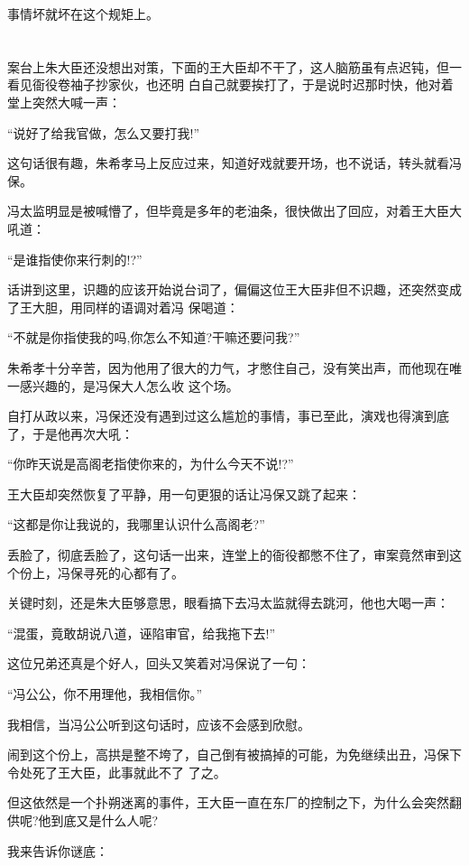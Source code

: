 \documentclass[11pt,a4paper,onecolumn]{article}
\begin{document}
事情坏就坏在这个规矩上。

\section[\thesection]{}

案台上朱大臣还没想出对策，下面的王大臣却不干了，这人脑筋虽有点迟钝，但一看见衙役卷袖子抄家伙，也还明
白自己就要挨打了，于是说时迟那时快，他对着堂上突然大喊一声：

``说好了给我官做，怎么又要打我!''

这句话很有趣，朱希孝马上反应过来，知道好戏就要开场，也不说话，转头就看冯保。

冯太监明显是被喊懵了，但毕竟是多年的老油条，很快做出了回应，对着王大臣大吼道：

``是谁指使你来行刺的!?''

话讲到这里，识趣的应该开始说台词了，偏偏这位王大臣非但不识趣，还突然变成了王大胆，用同样的语调对着冯
保喝道：

``不就是你指使我的吗,你怎么不知道?干嘛还要问我?''

朱希孝十分辛苦，因为他用了很大的力气，才憋住自己，没有笑出声，而他现在唯一感兴趣的，是冯保大人怎么收
这个场。

自打从政以来，冯保还没有遇到过这么尴尬的事情，事已至此，演戏也得演到底了，于是他再次大吼：

``你昨天说是高阁老指使你来的，为什么今天不说!?''

王大臣却突然恢复了平静，用一句更狠的话让冯保又跳了起来：

``这都是你让我说的，我哪里认识什么高阁老?''

丢脸了，彻底丢脸了，这句话一出来，连堂上的衙役都憋不住了，审案竟然审到这个份上，冯保寻死的心都有了。

关键时刻，还是朱大臣够意思，眼看搞下去冯太监就得去跳河，他也大喝一声：

``混蛋，竟敢胡说八道，诬陷审官，给我拖下去!''

这位兄弟还真是个好人，回头又笑着对冯保说了一句：

``冯公公，你不用理他，我相信你。''

我相信，当冯公公听到这句话时，应该不会感到欣慰。

闹到这个份上，高拱是整不垮了，自己倒有被搞掉的可能，为免继续出丑，冯保下令处死了王大臣，此事就此不了
了之。

但这依然是一个扑朔迷离的事件，王大臣一直在东厂的控制之下，为什么会突然翻供呢?他到底又是什么人呢?

我来告诉你谜底：
\end{document}

